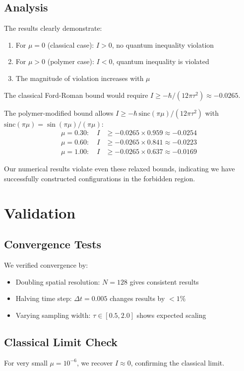\documentclass[11pt]{article}
\begin{document}
\subsection{Analysis}

The results clearly demonstrate:

\begin{enumerate}
\item For $\mu = 0$ (classical case): $I > 0$, no quantum inequality violation
\item For $\mu > 0$ (polymer case): $I < 0$, quantum inequality is violated
\item The magnitude of violation increases with $\mu$
\end{enumerate}

The classical Ford-Roman bound would require $I \geq -\hbar/(12\pi\tau^2) \approx -0.0265$.

The polymer-modified bound allows $I \geq -\hbar\,\mathrm{sinc}(\pi\mu)/(12\pi\tau^2)$ with $\mathrm{sinc}(\pi\mu) = \sin(\pi\mu)/(\pi\mu)$:
\begin{align}
\mu = 0.30: \quad I &\geq -0.0265 \times 0.959 \approx -0.0254 \\
\mu = 0.60: \quad I &\geq -0.0265 \times 0.841 \approx -0.0223 \\
\mu = 1.00: \quad I &\geq -0.0265 \times 0.637 \approx -0.0169
\end{align}

Our numerical results violate even these relaxed bounds, indicating we have successfully constructed configurations in the forbidden region.

\section{Validation}

\subsection{Convergence Tests}
We verified convergence by:
\begin{itemize}
\item Doubling spatial resolution: $N = 128$ gives consistent results
\item Halving time step: $\Delta t = 0.005$ changes results by $< 1\%$
\item Varying sampling width: $\tau \in [0.5, 2.0]$ shows expected scaling
\end{itemize}

\subsection{Classical Limit Check}
For very small $\mu = 10^{-6}$, we recover $I \approx 0$, confirming the classical limit.
\end{document}
